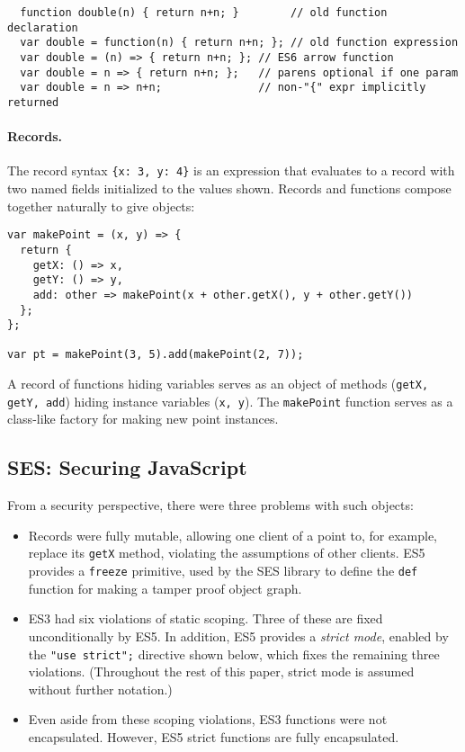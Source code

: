 \documentclass{llncs}
\begin{document}
\begin{verbatim}
  function double(n) { return n+n; }        // old function declaration
  var double = function(n) { return n+n; }; // old function expression
  var double = (n) => { return n+n; }; // ES6 arrow function
  var double = n => { return n+n; };   // parens optional if one param
  var double = n => n+n;               // non-"{" expr implicitly returned
\end{verbatim}

\paragraph{Records.} The record syntax {\tt \{x: 3, y: 4\}} is an expression that evaluates to a record with two named fields initialized to the values shown. Records and functions compose together naturally to give objects:

\begin{verbatim}
var makePoint = (x, y) => {
  return {
    getX: () => x,
    getY: () => y,
    add: other => makePoint(x + other.getX(), y + other.getY())
  };
};

var pt = makePoint(3, 5).add(makePoint(2, 7));
\end{verbatim}

A record of functions hiding variables serves as an object of methods ({\tt getX, getY, add}) hiding instance variables ({\tt x, y}). The {\tt makePoint} function serves as a class-like factory for making new point instances.


\subsection{SES: Securing JavaScript}




From a security perspective, there were three problems with such objects: 
\begin{itemize}
\item Records were fully mutable, allowing one client of a point to, for example, replace its {\tt getX} method, violating the assumptions of other clients. ES5 provides a {\tt freeze} primitive, used by the SES library to define the {\tt def} function for making a tamper proof object graph.
\item ES3 had six violations of static scoping. Three of these are fixed unconditionally by ES5. In addition, ES5 provides a \emph{strict mode}, enabled by the {\tt "use strict";} directive shown below, which fixes the remaining three violations. (Throughout the rest of this paper, strict mode is assumed without further notation.)  
\item Even aside from these scoping violations, ES3 functions were not encapsulated. However, ES5 strict functions are fully encapsulated.
\end{itemize}
\end{document}
